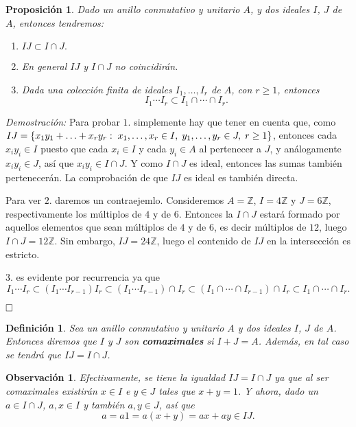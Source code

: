 \documentclass[12pt]{article}
\newtheorem{proposition}[theorem]{Proposición}
\newtheorem{definition}[theorem]{Definición}
\newtheorem{observation}{Observación}[theorem]
\begin{document}
\begin{proposition} Dado un anillo conmutativo y unitario $A$, y dos ideales $I$, $J$ de $A$, entonces tendremos: \begin{enumerate}
\item $IJ \subset I \cap J.$
\item En general $IJ$ y $I \cap J$ no coincidirán.
\item Dada una colección finita de ideales $I_{1}, \ldots, I_{r}$ de $A$, con $r \geq 1$, entonces $$I_{1} \cdots I_{r} \subset I_{1} \cap \cdots \cap I_{r}.$$
\end{enumerate} 
\end{proposition}
\emph{Demostración: }
Para probar $1.$ simplemente hay que tener en cuenta que, como $IJ =  \lbrace x_{1}y_{1} + \ldots + x_{r}y_{r} : \hspace{0.1cm} x_{1}, \ldots, x_{r} \in I, \hspace{0.1cm} y_{1}, \ldots, y_{r} \in J, \hspace{0.1cm} r \geq 1 \rbrace$, entonces cada $x_{i}y_{i} \in I$ puesto que cada $x_{i} \in I$ y cada $y_{i} \in A$ al pertenecer a $J$, y análogamente $x_{i}y_{i} \in J$, así que $x_{i}y_{i} \in I \cap J$. Y como $I \cap J$ es ideal, entonces las sumas también pertenecerán. La comprobación de que $IJ$ es ideal es también directa.

Para ver $2.$ daremos un contraejemlo. Consideremos $A = \mathbb{Z}$, $I = 4\mathbb{Z}$ y $J = 6\mathbb{Z}$, respectivamente los múltiplos de $4$ y de $6$. Entonces la $I \cap J$ estará formado por aquellos elementos que sean múltiplos de $4$ y de $6$, es decir múltiplos de $12$, luego $I \cap J = 12\mathbb{Z}$. Sin embargo, $IJ = 24\mathbb{Z}$, luego el contenido de $IJ$ en la intersección es estricto.

$3.$ es evidente por recurrencia ya que $$I_{1} \cdots I_{r} \subset (I_{1} \cdots I_{r-1} ) I_{r} \subset (I_{1} \cdots I_{r-1} ) \cap I_{r} \subset (I_{1} \cap \cdots \cap I_{r-1} ) \cap I_{r} \subset I_{1} \cap \cdots \cap I_{r}.$$

$\hfill \square$

\begin{definition} \label{eq:comax} Sea un anillo conmutativo y unitario $A$ y dos ideales $I$, $J$ de $A$. Entonces diremos que $I$ y $J$ son \textbf{comaximales} si $I + J = A$. Además, en tal caso se tendrá que $IJ = I \cap J$.
\end{definition}

\begin{observation} Efectivamente, se tiene la igualdad $IJ = I \cap J$ ya que al ser comaximales existirán $x \in I$ e $y \in J$ tales que $x +y = 1$. Y ahora, dado un $a \in I \cap J$, $a,x \in I$ y también $a, y \in J$, así que $$a = a1 = a(x+y) = ax + ay \in IJ.$$
\end{observation}
\end{document}
